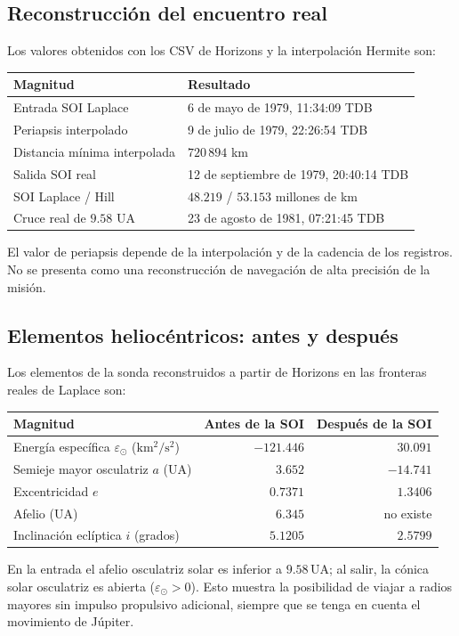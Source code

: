 \documentclass[11pt,a4paper]{article}
\begin{document}
\subsection{Reconstrucción del encuentro real}
Los valores obtenidos con los CSV de Horizons y la interpolación Hermite son:
\begin{center}\begin{tabular}{ll}\toprule
Magnitud & Resultado\\\midrule
Entrada SOI Laplace & 6 de mayo de 1979, 11:34:09 TDB\\
Periapsis interpolado & 9 de julio de 1979, 22:26:54 TDB\\
Distancia mínima interpolada & $720\,894$ km\\
Salida SOI real & 12 de septiembre de 1979, 20:40:14 TDB\\
SOI Laplace / Hill & $48.219$ / $53.153$ millones de km\\
Cruce real de $9.58$ UA & 23 de agosto de 1981, 07:21:45 TDB\\
\bottomrule\end{tabular}\end{center}
El valor de periapsis depende de la interpolación y de la cadencia de los registros. No se presenta como una reconstrucción de navegación de alta precisión de la misión.

\subsection{Elementos heliocéntricos: antes y después}
Los elementos de la sonda reconstruidos a partir de Horizons en las fronteras reales de Laplace son:
\begin{center}\begin{tabular}{lrr}\toprule
Magnitud & Antes de la SOI & Después de la SOI\\\midrule
Energía específica $\varepsilon_\odot$ ($\mathrm{km^2/s^2}$) & $-121.446$ & $30.091$\\
Semieje mayor osculatriz $a$ (UA) & $3.652$ & $-14.741$\\
Excentricidad $e$ & $0.7371$ & $1.3406$\\
Afelio (UA) & $6.345$ & no existe\\
Inclinación eclíptica $i$ (grados) & $5.1205$ & $2.5799$\\\bottomrule\end{tabular}\end{center}
En la entrada el afelio osculatriz solar es inferior a $9.58\,\mathrm{UA}$; al salir, la cónica solar osculatriz es abierta ($\varepsilon_\odot>0$). Esto muestra la posibilidad de viajar a radios mayores sin impulso propulsivo adicional, siempre que se tenga en cuenta el movimiento de Júpiter.
\end{document}
